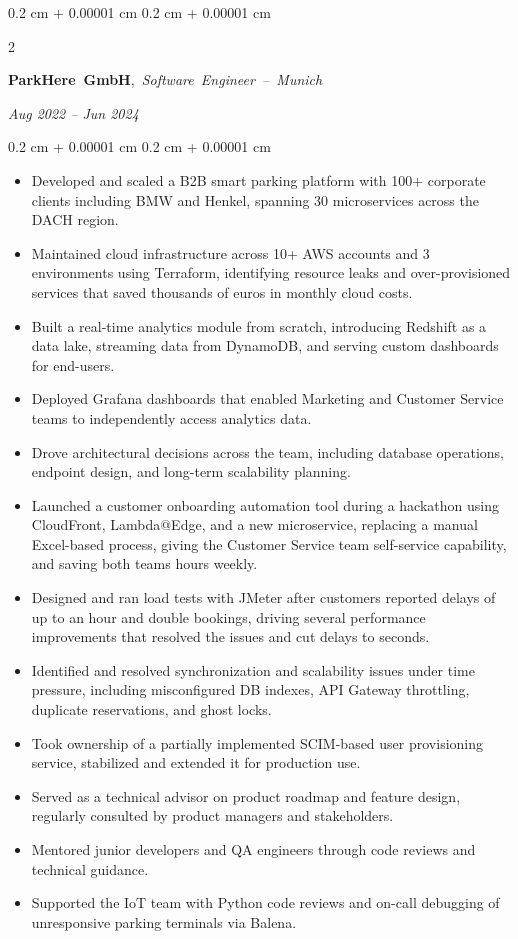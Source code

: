 \documentclass[10pt, letterpaper]{article}
\newenvironment{highlights}{
    \begin{itemize}[
        topsep=0.10 cm,
        parsep=0.10 cm,
        partopsep=0pt,
        itemsep=0pt,
        leftmargin=0.4 cm + 10pt
    ]
}{
    \end{itemize}
} %
\newenvironment{onecolentry}{
    \begin{adjustwidth}{
        0.2 cm + 0.00001 cm
    }{
        0.2 cm + 0.00001 cm
    }
}{
    \end{adjustwidth}
} %
\newenvironment{twocolentry}[2][]{
    \onecolentry
    \def\secondColumn{#2}
    \setcolumnwidth{\fill, 4.5 cm}
    \begin{paracol}{2}
}{
    \switchcolumn \raggedleft \secondColumn
    \end{paracol}
    \endonecolentry
} %
\begin{document}
        \newpage

        \begin{twocolentry}{
        \textit{Aug 2022 – Jun 2024}}
            \mbox{\textbf{ParkHere GmbH},
            \textit{Software Engineer -- Munich}
            }
        \end{twocolentry}

        \vspace{0.10 cm}
        \begin{onecolentry}
            \begin{highlights}
            \item Developed and scaled a B2B smart parking platform with 100+ corporate clients including BMW and Henkel, spanning \raisebox{0.3ex}{\scalebox{0.7}{$\sim$}}30 microservices across the DACH region.
\item Maintained cloud infrastructure across 10+ AWS accounts and 3 environments using Terraform, identifying resource leaks and over-provisioned services that saved thousands of euros in monthly cloud costs.
\item Built a real-time analytics module from scratch, introducing Redshift as a data lake, streaming data from DynamoDB, and serving custom dashboards for end-users.
\item Deployed Grafana dashboards that enabled Marketing and Customer Service teams to independently access analytics data.
\item Drove architectural decisions across the team, including database operations, endpoint design, and long-term scalability planning.
\item Launched a customer onboarding automation tool during a hackathon using CloudFront, Lambda@Edge, and a new microservice, replacing a manual Excel-based process, giving the Customer Service team self-service capability, and saving both teams hours weekly.
\item Designed and ran load tests with JMeter after customers reported delays of up to an hour and double bookings, driving several performance improvements that resolved the issues and cut delays to seconds.
\item Identified and resolved synchronization and scalability issues under time pressure, including misconfigured DB indexes, API Gateway throttling, duplicate reservations, and ghost locks.
\item Took ownership of a partially implemented SCIM-based user provisioning service, stabilized and extended it for production use.
\item Served as a technical advisor on product roadmap and feature design, regularly consulted by product managers and stakeholders.
\item Mentored junior developers and QA engineers through code reviews and technical guidance.
\item Supported the IoT team with Python code reviews and on-call debugging of unresponsive parking terminals via Balena.
            \end{highlights}
        \end{onecolentry}
\end{document}
